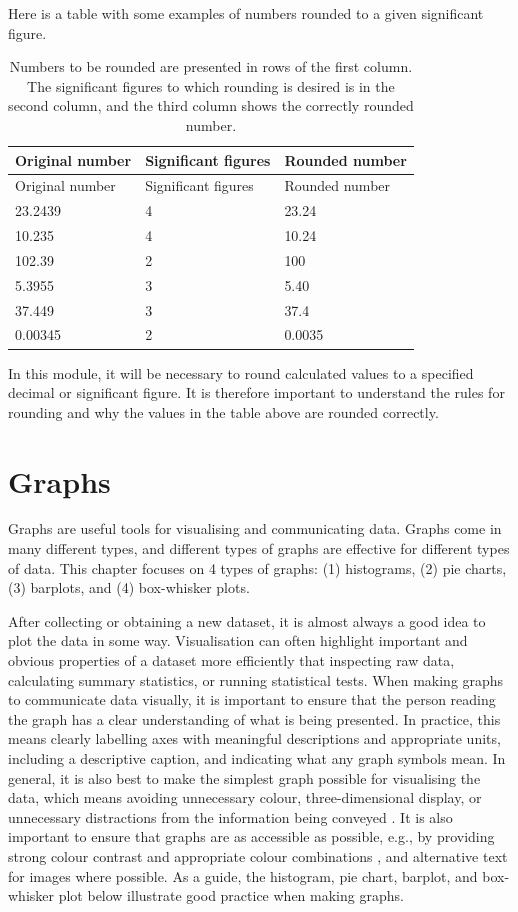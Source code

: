 \documentclass[
]{scrbook}
\begin{document}
Here is a table with some examples of numbers rounded to a given significant figure.

\begin{longtable}[]{@{}lll@{}}
\caption{Numbers to be rounded are presented in rows of the first column. The significant figures to which rounding is desired is in the second column, and the third column shows the correctly rounded number.}\tabularnewline
\toprule
Original number & Significant figures & Rounded number \\
\midrule
\endfirsthead
\toprule
Original number & Significant figures & Rounded number \\
\midrule
\endhead
23.2439 & 4 & 23.24 \\
10.235 & 4 & 10.24 \\
102.39 & 2 & 100 \\
5.3955 & 3 & 5.40 \\
37.449 & 3 & 37.4 \\
0.00345 & 2 & 0.0035 \\
\bottomrule
\end{longtable}

In this module, it will be necessary to round calculated values to a specified decimal or significant figure.
It is therefore important to understand the rules for rounding and why the values in the table above are rounded correctly.

\hypertarget{Chapter_10}{%
\chapter{Graphs}\label{Chapter_10}}

Graphs are useful tools for visualising and communicating data.
Graphs come in many different types, and different types of graphs are effective for different types of data.
This chapter focuses on 4 types of graphs: (1) histograms, (2) pie charts, (3) barplots, and (4) box-whisker plots.

After collecting or obtaining a new dataset, it is almost always a good idea to plot the data in some way.
Visualisation can often highlight important and obvious properties of a dataset more efficiently that inspecting raw data, calculating summary statistics, or running statistical tests.
When making graphs to communicate data visually, it is important to ensure that the person reading the graph has a clear understanding of what is being presented.
In practice, this means clearly labelling axes with meaningful descriptions and appropriate units, including a descriptive caption, and indicating what any graph symbols mean.
In general, it is also best to make the simplest graph possible for visualising the data, which means avoiding unnecessary colour, three-dimensional display, or unnecessary distractions from the information being conveyed \citep{Dytham2011, Kelleher2011}.
It is also important to ensure that graphs are as accessible as possible, e.g., by providing strong colour contrast and appropriate colour combinations \citep{Elavsky2022}, and alternative text for images where possible.
As a guide, the histogram, pie chart, barplot, and box-whisker plot below illustrate good practice when making graphs.
\end{document}
